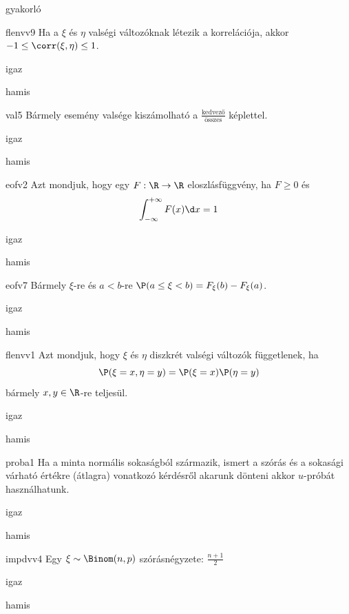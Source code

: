 \documentclass[12pt]{article}
\begin{document}
\begin{quiz}{gyakorló}
\begin{multi}[feedback={Tulajdonság,tétel.}]{flenvv9}
Ha a $\xi$ és $\eta$ valségi változóknak létezik a korrelációja, akkor $-1\le \corr(\xi,\eta)\le 1$.
\item* igaz
\item hamis
\end{multi}
\begin{multi}[feedback={Csak ha az elemi események egyforma valségűek.}]{val5}
Bármely esemény valsége kiszámolható a $\frac{\text{kedvező}}{\text{összes}}$ képlettel.
\item igaz
\item* hamis
\end{multi}
\begin{multi}[feedback={Ebből nem jön ki a pl. a monotonitás vagy a balról folytonosság.}]{eofv2}
Azt mondjuk, hogy egy $F:\R\to \R$ eloszlásfüggvény, ha $F\ge 0$ és 
$$
\int_{-\infty}^{+\infty}F(x)\d x=1
$$
\item igaz
\item* hamis
\end{multi}
\begin{multi}[feedback={$\{a\le\xi<b\}=\{\xi<b\}\setminus \{\xi<a\}$}]{eofv7}
Bármely $\xi$-re és $a<b$-re $\P(a\le \xi <b)=F_{\xi}(b)-F_{\xi}(a)$.
\item* igaz
\item hamis
\end{multi}
\begin{multi}[feedback={Def.}]{flenvv1}
Azt mondjuk, hogy $\xi$ és $\eta$ diszkrét valségi változók függetlenek, ha
$$
\P(\xi=x,\eta=y)=\P(\xi=x)\P(\eta=y)
$$
bármely $x,y\in \R$-re teljesül.
\item* igaz
\item hamis
\end{multi}
\begin{multi}[feedback={Ezek az $u$-próba használatának előzményei.}]{proba1}
Ha a minta normális sokaságból származik, ismert a szórás és a sokasági várható értékre (átlagra) vonatkozó kérdésről 
akarunk dönteni akkor $u$-próbát használhatunk.
\item* igaz
\item hamis
\end{multi}
\begin{multi}[feedback={$\xi=\xi_1+\ldots+\xi_n$, ahol $\xi_k$ Bernoulli és $\D^2(\xi_k)=p(1-p)$+$\D^2$-additívitása(függetlenség esetén)}]{impdvv4}
Egy $\xi\sim \Binom(n,p)$ szórásnégyzete: $\frac{n+1}{2}$
\item igaz
\item* hamis
\end{multi}

\end{quiz}
\end{document}
